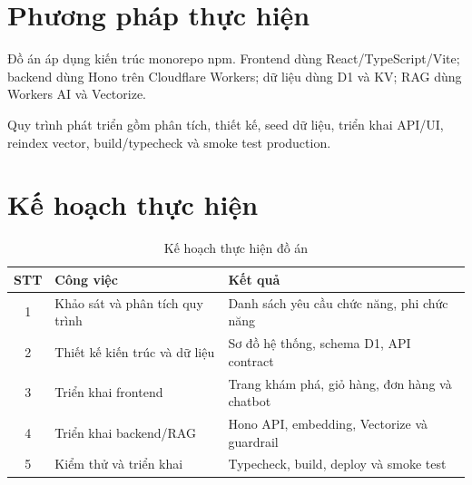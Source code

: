 \section{Phương pháp thực hiện}
Đồ án áp dụng kiến trúc monorepo npm. Frontend dùng React/TypeScript/Vite; backend dùng Hono trên Cloudflare Workers; dữ liệu dùng D1 và KV; RAG dùng Workers AI và Vectorize.

Quy trình phát triển gồm phân tích, thiết kế, seed dữ liệu, triển khai API/UI, reindex vector, build/typecheck và smoke test production.

\section{Kế hoạch thực hiện}
\begin{table}[H]
\centering
\caption{Kế hoạch thực hiện đồ án}
\label{tab:ke-hoach}
\begin{tabular}{|c|p{4.5cm}|p{6.5cm}|}
\hline
\textbf{STT} & \textbf{Công việc} & \textbf{Kết quả} \\
\hline
1 & Khảo sát và phân tích quy trình & Danh sách yêu cầu chức năng, phi chức năng \\
\hline
2 & Thiết kế kiến trúc và dữ liệu & Sơ đồ hệ thống, schema D1, API contract \\
\hline
3 & Triển khai frontend & Trang khám phá, giỏ hàng, đơn hàng và chatbot \\
\hline
4 & Triển khai backend/RAG & Hono API, embedding, Vectorize và guardrail \\
\hline
5 & Kiểm thử và triển khai & Typecheck, build, deploy và smoke test \\
\hline
\end{tabular}
\end{table}
